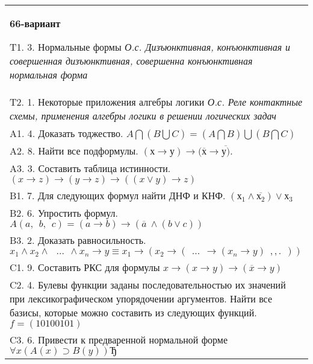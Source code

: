 \documentclass{article}
\begin{document}
\begin{tabular}{m{17cm}}
\textbf{66-вариант}
\newline

T1. 3. Нормальные формы \emph{О.с. Дизъюнктивная, конъюнктивная и совершенная дизъюнктивная, совершенна конъюнктивная нормальная форма} \\
T2. 1. Некоторые приложения алгебры логики \emph{О.с. Реле контактные схемы, применения алгебры логики в решении логических задач} \\
A1. 4. Доказать тоджество. \(A\bigcap(B\bigcup C) = (A\bigcap B)\bigcup(B\bigcap C)\) \\
A2. 8. Найти все подформулы. \((х \rightarrow у) \rightarrow (\overline{х} \rightarrow \overline{у)}\). \\
A3. 3. Составить таблица истинности. \((x \rightarrow z) \rightarrow (y \rightarrow z) \rightarrow ((x \vee y) \rightarrow z)\) \\
B1. 7. Для следующих формул найти ДНФ и КНФ. \(\left( х_{1} \land \overline{х_{2}} \right) \vee х_{3}\) \\
B2. 6. Упростить формул. \(A(a,\ \ b,\ \ c) = (a \rightarrow b) \rightarrow (\overline{a}\  \land (b \vee c))\) \\
B3. 2. Доказать равносильность.\(x_{1} \land x_{2} \land \ \ \ ...\ \  \land x_{n} \rightarrow y \equiv x_{1} \rightarrow (x_{2} \rightarrow (\ \ ...\ \  \rightarrow (x_{n} \rightarrow y)\ \ ,,.\ \ ))\) \\
C1. 9. Составить РКС для формулы \(x \rightarrow (x \rightarrow y) \rightarrow (\overline{x} \rightarrow y)\ \) \\
C2. 4. Булевы функции заданы последовательностью их значений при лексикографическом упорядочении аргументов. Найти все базисы, которые можно составить из следующих функций. \(f = (10100101)\) \\
C3. 6. Привести к предваренной нормальной форме \(\forall x(A(x) \supset B(y))Ђ\) \\

\end{tabular}
\vspace{1cm}
\end{document}
